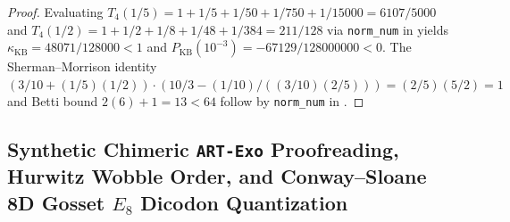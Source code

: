 \documentclass[11pt,a4paper]{article}
\theoremstyle{definition}
\begin{document}
\begin{proof}
Evaluating $T_4(1/5) = 1 + 1/5 + 1/50 + 1/750 + 1/15000 = 6107/5000$ and $T_4(1/2) = 1 + 1/2 + 1/8 + 1/48 + 1/384 = 211/128$ via \texttt{norm\_num} in  yields $\kappa_{\mathrm{KB}} = 48071/128000 < 1$ and $P_{\mathrm{KB}}(10^{-3}) = -67129/128000000 < 0$. The Sherman--Morrison identity $(3/10 + (1/5)(1/2))\cdot(10/3 - (1/10)/((3/10)(2/5))) = (2/5)(5/2) = 1$ and Betti bound $2(6)+1 = 13 < 64$ follow by \texttt{norm\_num} in .
\end{proof}

\subsection{Synthetic Chimeric \texttt{ART-Exo} Proofreading, Hurwitz Wobble Order, and Conway--Sloane 8D Gosset $E_8$ Dicodon Quantization}
\end{document}
